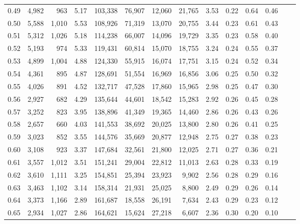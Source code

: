 \begin{tabular}{rrrrrrrrrrrrrr}
0.49 &  4,982 &    963 &    5.17 &  103,338 &   76,907 &  12,060 &  21,765 &  3.53 &  0.22 &  0.64 &      0.46 \\
0.50 &  5,588 &  1,010 &    5.53 &  108,926 &   71,319 &  13,070 &  20,755 &  3.44 &  0.23 &  0.61 &      0.43 \\
0.51 &  5,312 &  1,026 &    5.18 &  114,238 &   66,007 &  14,096 &  19,729 &  3.35 &  0.23 &  0.58 &      0.40 \\
0.52 &  5,193 &    974 &    5.33 &  119,431 &   60,814 &  15,070 &  18,755 &  3.24 &  0.24 &  0.55 &      0.37 \\
0.53 &  4,899 &  1,004 &    4.88 &  124,330 &   55,915 &  16,074 &  17,751 &  3.15 &  0.24 &  0.52 &      0.34 \\
0.54 &  4,361 &    895 &    4.87 &  128,691 &   51,554 &  16,969 &  16,856 &  3.06 &  0.25 &  0.50 &      0.32 \\
0.55 &  4,026 &    891 &    4.52 &  132,717 &   47,528 &  17,860 &  15,965 &  2.98 &  0.25 &  0.47 &      0.30 \\
0.56 &  2,927 &    682 &    4.29 &  135,644 &   44,601 &  18,542 &  15,283 &  2.92 &  0.26 &  0.45 &      0.28 \\
0.57 &  3,252 &    823 &    3.95 &  138,896 &   41,349 &  19,365 &  14,460 &  2.86 &  0.26 &  0.43 &      0.26 \\
0.58 &  2,657 &    660 &    4.03 &  141,553 &   38,692 &  20,025 &  13,800 &  2.80 &  0.26 &  0.41 &      0.25 \\
0.59 &  3,023 &    852 &    3.55 &  144,576 &   35,669 &  20,877 &  12,948 &  2.75 &  0.27 &  0.38 &      0.23 \\
0.60 &  3,108 &    923 &    3.37 &  147,684 &   32,561 &  21,800 &  12,025 &  2.71 &  0.27 &  0.36 &      0.21 \\
0.61 &  3,557 &  1,012 &    3.51 &  151,241 &   29,004 &  22,812 &  11,013 &  2.63 &  0.28 &  0.33 &      0.19 \\
0.62 &  3,610 &  1,111 &    3.25 &  154,851 &   25,394 &  23,923 &   9,902 &  2.56 &  0.28 &  0.29 &      0.16 \\
0.63 &  3,463 &  1,102 &    3.14 &  158,314 &   21,931 &  25,025 &   8,800 &  2.49 &  0.29 &  0.26 &      0.14 \\
0.64 &  3,373 &  1,166 &    2.89 &  161,687 &   18,558 &  26,191 &   7,634 &  2.43 &  0.29 &  0.23 &      0.12 \\
0.65 &  2,934 &  1,027 &    2.86 &  164,621 &   15,624 &  27,218 &   6,607 &  2.36 &  0.30 &  0.20 &      0.10 \\

\end{tabular}
